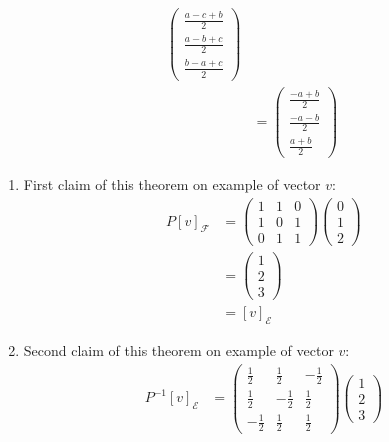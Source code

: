 \begin{exm}
\begin{align*}
\begin{pmatrix}
			\frac{a-c+b}{2} \\[4pt]
			\frac{a-b+c}{2} \\[4pt]
			\frac{b-a+c}{2}
		\end{pmatrix} \\
		                               & =\begin{pmatrix}
			\frac{-a+b}{2} \\[4pt]
			\frac{-a-b}{2} \\[4pt]
			\frac{a+b}{2}
		\end{pmatrix}
	\end{align*}
	\begin{enumerate}
		\item First claim of this theorem on example of vector $v$:
		      \begin{align*}
			      P[v]_\mathcal{F} & =\begin{pmatrix}
				      1 & 1 & 0 \\
				      1 & 0 & 1 \\
				      0 & 1 & 1
			      \end{pmatrix}\begin{pmatrix}
				      0 \\1\\2
			      \end{pmatrix} \\
			                       & =\begin{pmatrix}
				      1 \\2\\3
			      \end{pmatrix}                           \\
			                       & =[v]_\mathcal{E}
		      \end{align*}
		\item Second claim of this theorem on example of vector $v$:
		      \begin{align*}
			      P^{-1}[v]_\mathcal{E} & =\begin{pmatrix}
				      \frac{1}{2}  & \frac{1}{2}  & -\frac{1}{2} \\[4pt]
				      \frac{1}{2}  & -\frac{1}{2} & \frac{1}{2}  \\[4pt]
				      -\frac{1}{2} & \frac{1}{2}  & \frac{1}{2}
			      \end{pmatrix}\begin{pmatrix}
				      1 \\2\\3
			      \end{pmatrix} \\

\end{align*}
\end{enumerate}
\end{exm}

